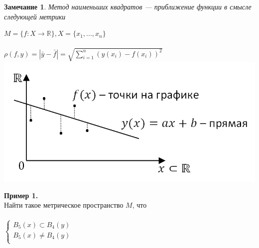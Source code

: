 \documentclass[12pt]{article}
\newtheorem*{notice}{Замечание}
\begin{document}
	\begin{notice}
		Метод наименьших квадратов --- приближение функции в смысле следующей метрики \begin{center} $M = \{f: X \rightarrow \mathbb{R} \}, X = \{ x_1, ..., x_n \}$\\ ~\\
			$\rho (f, y) = |\bar y - \bar f| = \sqrt{\sum\limits_{i=1}^n(y(x_i)-f(x_i))^2}$ \\
			\includegraphics[scale=0.6]{l4_4.png}\end{center}
	\end{notice}
	\noindent \textbf{Пример 1.}\\
	Найти такое метрическое пространство $M$, что\\ \\
	$  
	\left\{  
	\begin{array}{lcl}  
	B_5(x) \subset B_4(y) \\  
	B_5(x) \neq B_4(y)\\
	\end{array}   
	\right.  
	$
\end{document}
